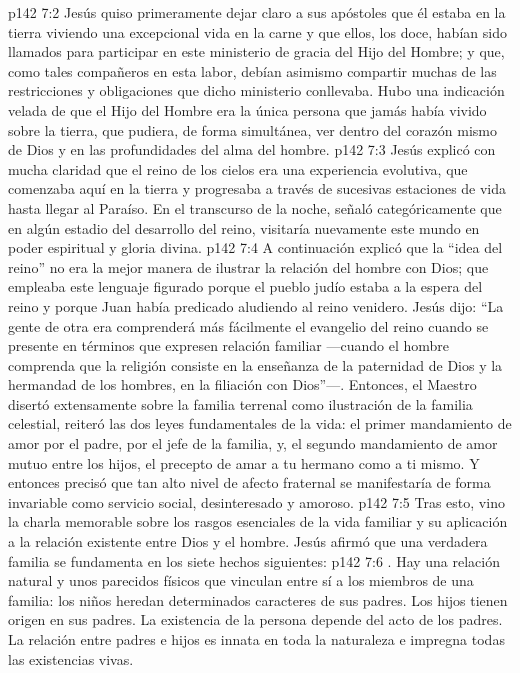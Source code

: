 \vs p142 7:2 Jesús quiso primeramente dejar claro a sus apóstoles que él estaba en la tierra viviendo una excepcional vida en la carne y que ellos, los doce, habían sido llamados para participar en este ministerio de gracia del Hijo del Hombre; y que, como tales compañeros en esta labor, debían asimismo compartir muchas de las restricciones y obligaciones que dicho ministerio conllevaba. Hubo una indicación velada de que el Hijo del Hombre era la única persona que jamás había vivido sobre la tierra, que pudiera, de forma simultánea, ver dentro del corazón mismo de Dios y en las profundidades del alma del hombre.
\vs p142 7:3 Jesús explicó con mucha claridad que el reino de los cielos era una experiencia evolutiva, que comenzaba aquí en la tierra y progresaba a través de sucesivas estaciones de vida hasta llegar al Paraíso. En el transcurso de la noche, señaló categóricamente que en algún estadio del desarrollo del reino, visitaría nuevamente este mundo en poder espiritual y gloria divina.
\vs p142 7:4 A continuación explicó que la “idea del reino” no era la mejor manera de ilustrar la relación del hombre con Dios; que empleaba este lenguaje figurado porque el pueblo judío estaba a la espera del reino y porque Juan había predicado aludiendo al reino venidero. Jesús dijo: “La gente de otra era comprenderá más fácilmente el evangelio del reino cuando se presente en términos que expresen relación familiar ---cuando el hombre comprenda que la religión consiste en la enseñanza de la paternidad de Dios y la hermandad de los hombres, en la filiación con Dios”---. Entonces, el Maestro disertó extensamente sobre la familia terrenal como ilustración de la familia celestial, reiteró las dos leyes fundamentales de la vida: el primer mandamiento de amor por el padre, por el jefe de la familia, y, el segundo mandamiento de amor mutuo entre los hijos, el precepto de amar a tu hermano como a ti mismo. Y entonces precisó que tan alto nivel de afecto fraternal se manifestaría de forma invariable como servicio social, desinteresado y amoroso.
\vs p142 7:5 Tras esto, vino la charla memorable sobre los rasgos esenciales de la vida familiar y su aplicación a la relación existente entre Dios y el hombre. Jesús afirmó que una verdadera familia se fundamenta en los siete hechos siguientes:
\vs p142 7:6 . Hay una relación natural y unos parecidos físicos que vinculan entre sí a los miembros de una familia: los niños heredan determinados caracteres de sus padres. Los hijos tienen origen en sus padres. La existencia de la persona depende del acto de los padres. La relación entre padres e hijos es innata en toda la naturaleza e impregna todas las existencias vivas.
